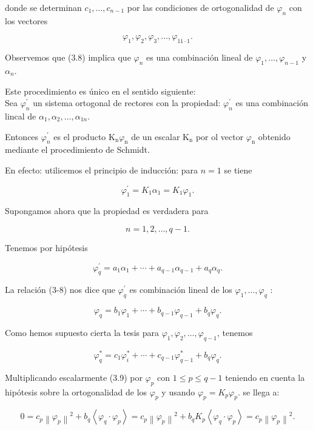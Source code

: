 \documentclass[10pt]{article}
\theoremstyle{plain}
\theoremstyle{definition}
\theoremstyle{remark}
\begin{document}
donde se determinan $c_{1}, \ldots, c_{n-1}$ por las condiciones de ortogonalidad de $\varphi_{n}$ con los vectores

$$
\varphi_{1}, \varphi_{2}, \varphi_{3}, \ldots, \varphi_{11 \cdot 1} .
$$

Observemos que (3.8) implica que $\varphi_{n}$ es una combinación lineal de $\varphi_{1}, \ldots, \varphi_{n-1}$ y $\alpha_{n}$.

Este procedimiento es único en el sentido siguiente:\\
Sea $\varphi_{n}^{\prime}$ un sistema ortogonal de rectores con la propiedad: $\varphi_{n}^{\prime}$ es una combinación lincal de $\alpha_{1}, \alpha_{2}, \ldots, \alpha_{1 n}$.

Entonces $\varphi_{n}^{\prime}$ es el producto $\mathrm{K}_{\mathrm{n}} \varphi_{\mathrm{n}}$ de un escalar $\mathrm{K}_{\mathrm{n}}$ por ol vector $\varphi_{\mathrm{n}}$ obtenido mediante el procedimiento de Schmidt.

En efecto: utilicemos el principio de inducción: para $n=1$ se tiene

$$
\varphi_{1}^{\prime}=K_{1} \alpha_{1}=K_{1} \varphi_{1} .
$$

Supongamos ahora que la propiedad es verdadera para

$$
n=1,2, \ldots, q-1 .
$$

Tenemos por hipótesis

$$
\varphi_{q}^{\prime}=a_{1} \alpha_{1}+\cdots+a_{q-1} \alpha_{q-1}+a_{q} \alpha_{q} .
$$

La relación (3-8) nos dice que $\varphi_{\dot{q}}^{\prime}$ es combinación lineal de los $\varphi_{1}, \ldots, \varphi_{q}$ :

$$
\varphi_{q}=b_{1} \varphi_{1}+\cdots+b_{q-1} \varphi_{q-1}+b_{q} \varphi_{q} .
$$

Como hemos supuesto cierta la tesis para $\varphi_{1}, \varphi_{2}, \ldots, \varphi_{q-1}$, tenemos


\begin{equation*}
\varphi_{q}^{*}=c_{1} \varphi_{i}^{*}+\cdots+c_{q-1} \varphi_{q-1}^{*}+b_{q} \varphi_{q} . \tag{3-9}
\end{equation*}


Multiplicando escalarmente (3.9) por $\varphi_{p}$ con $1 \leqslant p \leqslant q-1$ teniendo en cuenta la hipótesis sobre la ortogonalidad de los $\varphi_{p}$ y usando $\varphi_{p}=K_{p} \varphi_{p}$. se llega a:

$$
0=c_{p}\left\|\varphi_{\dot{p}}\right\|^{2}+b_{q}\left\langle\varphi_{q} \cdot \varphi_{p}\right\rangle=c_{p}\left\|\varphi_{\dot{p}}\right\|^{2}+b_{q} K_{p}\left\langle\varphi_{q} \cdot \varphi_{p}\right\rangle=c_{p}\left\|\varphi_{p}\right\|^{2} .
$$
\end{document}

